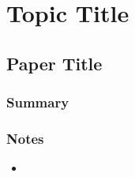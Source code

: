 \section{Topic Title}
\subsection{Paper Title}
\bibentry{}
\subsubsection*{Summary}
\subsubsection*{Notes}
\begin{itemize}
\item
\end{itemize}